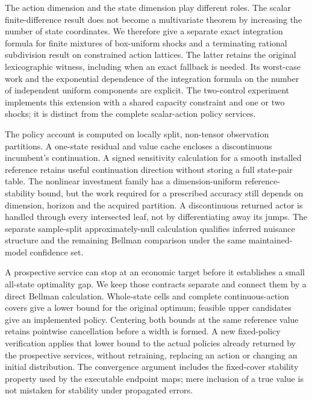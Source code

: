The action dimension and the state dimension play different roles. The scalar finite-difference result does not become a multivariate theorem by increasing the number of state coordinates. We therefore give a separate exact integration formula for finite mixtures of box-uniform shocks and a terminating rational subdivision result on constrained action lattices. The latter retains the original lexicographic witness, including when an exact fallback is needed. Its worst-case work and the exponential dependence of the integration formula on the number of independent uniform components are explicit. The two-control experiment implements this extension with a shared capacity constraint and one or two shocks; it is distinct from the complete scalar-action policy services.

The policy account is computed on locally split, non-tensor observation partitions. A one-state residual and value cache encloses a discontinuous incumbent's continuation. A signed sensitivity calculation for a smooth installed reference retains useful continuation direction without storing a full state-pair table. The nonlinear investment family has a dimension-uniform reference-stability bound, but the work required for a prescribed accuracy still depends on dimension, horizon and the acquired partition. A discontinuous returned actor is handled through every intersected leaf, not by differentiating away its jumps. The separate sample-split approximately-null calculation qualifies inferred nuisance structure and the remaining Bellman comparison under the same maintained-model confidence set.

A prospective service can stop at an economic target before it establishes a small all-state optimality gap. We keep those contracts separate and connect them by a direct Bellman calculation. Whole-state cells and complete continuous-action covers give a lower bound for the original optimum; feasible upper candidates give an implemented policy. Centering both bounds at the same reference value retains pointwise cancellation before a width is formed. A new fixed-policy verification applies that lower bound to the actual policies already returned by the prospective services, without retraining, replacing an action or changing an initial distribution. The convergence argument includes the fixed-cover stability property used by the executable endpoint maps; mere inclusion of a true value is not mistaken for stability under propagated errors.


